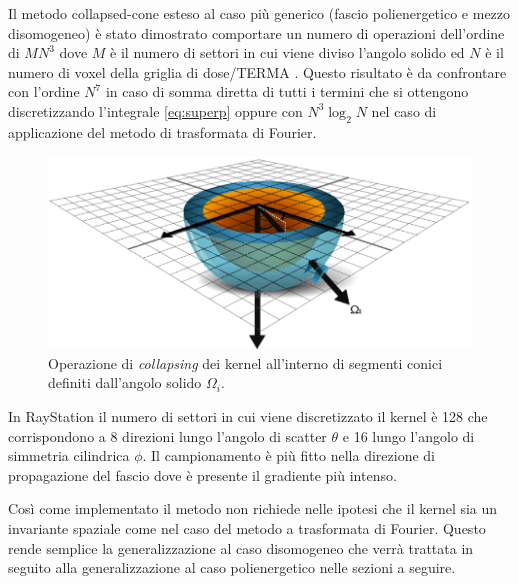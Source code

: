{Il metodo collapsed-cone esteso al caso più generico (fascio polienergetico e mezzo disomogeneo) è stato dimostrato comportare un numero di operazioni dell'ordine di $MN^3$ dove $M$ è il numero di settori in cui viene diviso l'angolo solido ed $N$ è il numero di voxel della griglia di dose/TERMA \cite{Ahnesjo1989}. Questo risultato è da confrontare con l'ordine $N^7$ in caso di somma diretta di tutti i termini che si ottengono discretizzando l'integrale \eqref{eq:superp} oppure con $N^3\log_2N$ nel caso di applicazione del metodo di trasformata di Fourier.

\begin{figure}
\centering
\includegraphics[width=\textwidth]{./cap1/kern_collaps.png}
\caption{Operazione di \textit{collapsing} dei kernel all'interno di segmenti conici definiti dall'angolo solido $\Omega_i$.}
\label{fig:kern_collaps}
\end{figure}

In RayStation il numero di settori in cui viene discretizzato il kernel è 128 che corrispondono a 8 direzioni lungo l'angolo di scatter $\theta$ e 16 lungo l'angolo di simmetria cilindrica $\phi$. Il campionamento è più fitto nella direzione di propagazione del fascio dove è presente il gradiente più intenso.

Così come implementato il metodo non richiede nelle ipotesi che il kernel sia un invariante spaziale come nel caso del metodo a trasformata di Fourier. Questo rende semplice la generalizzazione al caso disomogeneo che verrà trattata in seguito alla generalizzazione al caso polienergetico nelle sezioni a seguire.

}
